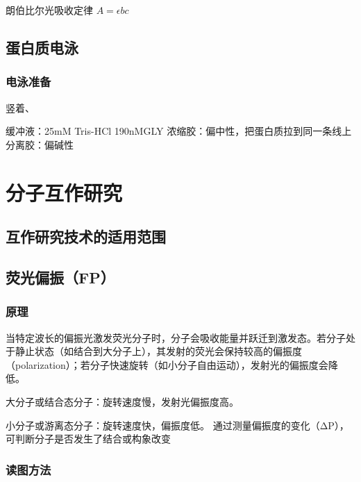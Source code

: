 朗伯比尔光吸收定律 $A=\epsilon bc$

\subsection{蛋白质电泳}

\subsubsection{电泳准备}

竖着、

缓冲液：25mM Tris-HCl  190nMGLY
浓缩胶：偏中性，把蛋白质拉到同一条线上
分离胶：偏碱性


\section{分子互作研究}

\subsection{互作研究技术的适用范围}

\subsection{荧光偏振（FP）}

\subsubsection{原理}

当特定波长的偏振光激发荧光分子时，分子会吸收能量并跃迁到激发态。若分子处于静止状态（如结合到大分子上），其发射的荧光会保持较高的偏振度（polarization）；若分子快速旋转（如小分子自由运动），发射光的偏振度会降低。

大分子或结合态分子：旋转速度慢，发射光偏振度高。

小分子或游离态分子：旋转速度快，偏振度低。
通过测量偏振度的变化（ΔP），可判断分子是否发生了结合或构象改变

\subsubsection{读图方法}



